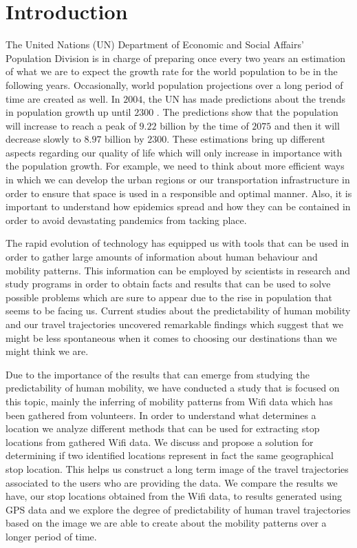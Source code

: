 \chapter{Introduction}

The United Nations (UN) Department of Economic and Social Affairs' Population
Division is in charge of preparing once every two years an estimation of what we
are to expect the growth rate for the world population to be in the following
years. Occasionally, world population projections over a long period of time are
created as well. In $2004$, the UN has made predictions about the trends in
population growth up until $2300$ \cite{UNWp}. The predictions show that the
population will increase to reach a peak of $9.22$ billion by the time of $2075$
and then it will decrease slowly to $8.97$ billion by $2300$. These estimations
bring up different aspects regarding our quality of life which will only
increase in importance with the population growth. For example, we need to think
about more efficient ways in which we can develop the urban regions or our
transportation infrastructure in order to ensure that space is used in a
responsible and optimal manner. Also, it is important to understand how
epidemics spread and how they can be contained in order to avoid devastating
pandemics from tacking place.

The rapid evolution of technology has equipped us with tools that can be used in
order to gather large amounts of information about human behaviour and mobility
patterns. This information can be employed by scientists in research and study
programs in order to obtain facts and results that can be used to solve possible
problems which are sure to appear due to the rise in population that seems
to be facing us. Current studies about the predictability of human mobility and
our travel trajectories uncovered remarkable findings which suggest that we
might be less spontaneous when it comes to choosing our destinations than we
might think we are. 

Due to the importance of the results that can emerge from studying the
predictability of human mobility, we have conducted a study that is focused on
this topic, mainly the inferring of mobility patterns from Wifi data which has
been gathered from volunteers. In order to understand what determines a location
we analyze different methods that can be used for extracting stop locations from
gathered Wifi data. We discuss and propose a solution for determining if two
identified locations represent in fact the same geographical stop location. This
helps us construct a long term image of the travel trajectories associated to
the users who are providing the data. We compare the results we have, our stop
locations obtained from the Wifi data, to results generated using GPS data and
we explore the degree of predictability of human travel trajectories based on
the image we are able to create about the mobility patterns over a longer period
of time.

